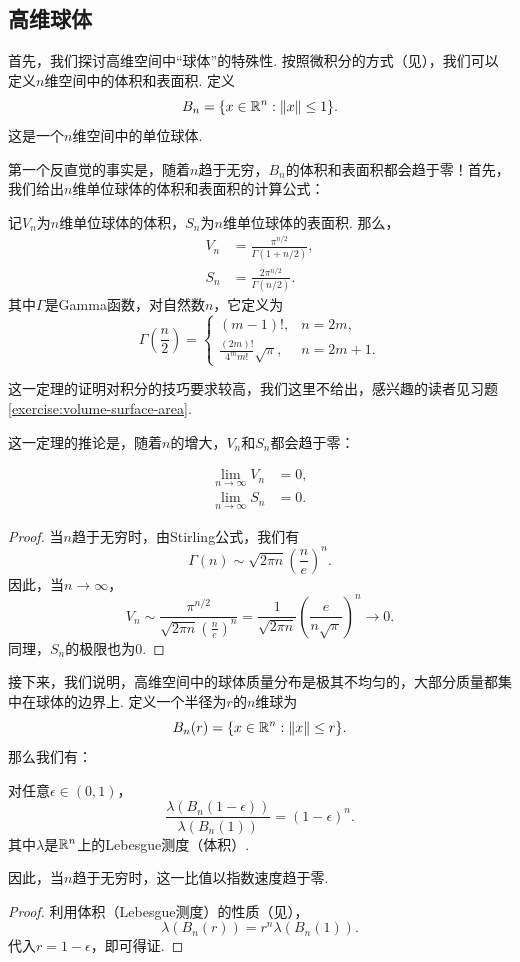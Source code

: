 \subsection{高维球体}
首先，我们探讨高维空间中“球体”的特殊性. 按照微积分的方式（见），我们可以定义$n$维空间中的体积和表面积. 定义
\[B_n = \{x \in \mathbb{R}^n: \left\|x\right\| \leq 1\}.\]
这是一个$n$维空间中的单位球体. 

第一个反直觉的事实是，随着$n$趋于无穷，$B_n$的体积和表面积都会趋于零！首先，我们给出$n$维单位球体的体积和表面积的计算公式：

\begin{theorem}\label{theorem:volume-surface-area}
记$V_n$为$n$维单位球体的体积，$S_n$为$n$维单位球体的表面积. 那么，
\begin{align*}
    V_n&=\frac{\pi^{n/2}}{\Gamma(1+n/2)},\\
    S_n&=\frac{2\pi^{n/2}}{\Gamma(n/2)}.
\end{align*}
其中$\Gamma$是Gamma函数，对自然数$n$，它定义为
\[\Gamma\left(\frac{n}{2}\right)=\begin{cases}
    (m-1)!, & n=2m,\\
    \frac{(2m)!}{4^mm!}\sqrt{\pi}, & n=2m+1.
\end{cases}
\]
\end{theorem}
这一定理的证明对积分的技巧要求较高，我们这里不给出，感兴趣的读者见习题 \ref{exercise:volume-surface-area}.

这一定理的推论是，随着$n$的增大，$V_n$和$S_n$都会趋于零：

\begin{corollary}
\begin{align*}
    \lim_{n\to\infty} V_n&=0,\\
    \lim_{n\to\infty} S_n&=0.
\end{align*}
\end{corollary}
\begin{proof}
    当$n$趋于无穷时，由Stirling公式，我们有
        \[\Gamma(n)\sim\sqrt{2\pi n}\left(\frac{n}{e}\right)^n.\]
    因此，当$n\to\infty$，
    \[V_n\sim\frac{\pi^{n/2}}{\sqrt{2\pi n}\left(\frac{n}{e}\right)^n}=\frac{1}{\sqrt{2\pi n}}\left(\frac{e}{n\sqrt{\pi}}\right)^n\to 0.\]
    同理，$S_n$的极限也为$0$.
\end{proof}

接下来，我们说明，高维空间中的球体质量分布是极其不均匀的，大部分质量都集中在球体的边界上. 定义一个半径为$r$的$n$维球为
\[B_n(r) = \{x \in \mathbb{R}^n: \left\|x\right\| \leq r\}.\]
那么我们有：
\begin{proposition}
对任意$\epsilon\in(0,1)$，
\[\frac{\lambda(B_n(1-\epsilon))}{\lambda(B_n(1))}=(1-\epsilon)^n.\]
其中$\lambda$是$\mathbb{R}^n$上的Lebesgue测度（体积）. 

因此，当$n$趋于无穷时，这一比值以指数速度趋于零. 
\end{proposition}
\begin{proof}
    利用体积（Lebesgue测度）的性质（见），
    \[\lambda(B_n(r))=r^n\lambda(B_n(1)).\]
    代入$r=1-\epsilon$，即可得证.
\end{proof}

